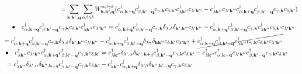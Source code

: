 \documentclass[12pt,english,a4paper]{article}
\newcommand{\dg}{\dagger}
\begin{document}
\begin{appendices}
\begin{align}
	&= \sum_{\textbf{k}, \textbf{k}', \textbf{q}} \sum_{\alpha \beta \gamma \delta} W^{\alpha \beta \gamma \delta}_{\textbf{k},\textbf{k'},\textbf{q}}( c_{\alpha, \textbf{k}+\textbf{q}}^\dg c_{\beta, \textbf{k}' - \textbf{q}}^\dg c_{\gamma, \textbf{k}}c_{\delta, \textbf{k'}}c^\dg_{\lambda \textbf{k}''} c_{\lambda' \textbf{k}''} 
	-  c^\dg_{\lambda \textbf{k}''} c_{\lambda' \textbf{k}''}c_{\alpha, \textbf{k}+\textbf{q}}^\dg c_{\beta, \textbf{k}' - \textbf{q}}^\dg c_{\gamma, \textbf{k}}c_{\delta, \textbf{k'}}) \nonumber \\
\bullet	 \quad c_{\alpha, \textbf{k}+\textbf{q}}^\dg c_{\beta, \textbf{k}' - \textbf{q}}^\dg &c_{\gamma, \textbf{k}}c_{\delta, \textbf{k'}}c^\dg_{\lambda \textbf{k}''} c_{\lambda' \textbf{k}''} = c_{\alpha, \textbf{k}+\textbf{q}}^\dg c_{\beta, \textbf{k}' - \textbf{q}}^\dg c_{\gamma, \textbf{k}}\delta_{\lambda,\delta} \delta_{\textbf{k}',\textbf{k}''} c_{\lambda' \textbf{k}''} - c_{\alpha, \textbf{k}+\textbf{q}}^\dg c_{\beta, \textbf{k}' - \textbf{q}}^\dg c_{\gamma, \textbf{k}} c^\dg_{\lambda \textbf{k}''}c_{\delta, \textbf{k'}} c_{\lambda' \textbf{k}''} \nonumber\\
%
%
= c_{\alpha, \textbf{k}+\textbf{q}}^\dg c_{\beta, \textbf{k}' - \textbf{q}}^\dg c_{\gamma, \textbf{k}}&\delta_{\lambda,\delta} \delta_{\textbf{k}',\textbf{k}''} c_{\lambda' \textbf{k}''} - c_{\alpha, \textbf{k}+\textbf{q}}^\dg c_{\beta, \textbf{k}' - \textbf{q}}^\dg \delta_{\lambda \gamma} \delta_{\textbf{k}\textbf{k}''}c_{\delta, \textbf{k'}} c_{\lambda' \textbf{k}''} 
+ \cancel{c_{\alpha, \textbf{k}+\textbf{q}}^\dg c_{\beta, \textbf{k}' - \textbf{q}}^\dg c^\dg_{\lambda \textbf{k}''}c_{\gamma, \textbf{k}} c_{\delta, \textbf{k'}} c_{\lambda' \textbf{k}''}}\nonumber \\
%
%
\bullet	 \quad c^\dg_{\lambda \textbf{k}''} c_{\lambda' \textbf{k}''} c_{\alpha, \textbf{k}+\textbf{q}}^\dg &c_{\beta, \textbf{k}' - \textbf{q}}^\dg c_{\gamma, \textbf{k}}c_{\delta, \textbf{k'}} = c^\dg_{\lambda \textbf{k}''} \delta_{\lambda',\alpha} \delta_{\textbf{k}'',\textbf{k}+q} c_{\beta, \textbf{k}' - \textbf{q}}^\dg c_{\gamma, \textbf{k}}c_{\delta, \textbf{k'}} - c^\dg_{\lambda \textbf{k}''}  c_{\alpha, \textbf{k}+\textbf{q}}^\dg c_{\lambda' \textbf{k}''} c_{\beta, \textbf{k}' - \textbf{q}}^\dg c_{\gamma, \textbf{k}}c_{\delta, \textbf{k'}} \nonumber\\
= c^\dg_{\lambda \textbf{k}''} \delta_{\lambda',\alpha} \delta_{\textbf{k}'',\textbf{k}+q} &c_{\beta, \textbf{k}' - \textbf{q}}^\dg c_{\gamma, \textbf{k}}c_{\delta, \textbf{k'}} - c^\dg_{\lambda \textbf{k}''}  c_{\alpha, \textbf{k}+\textbf{q}}^\dg \delta_{\lambda'\beta} \delta_{\textbf{k}'',\textbf{k}'-\textbf{q}} c_{\gamma, \textbf{k}}c_{\delta, \textbf{k'}}

\end{align}
\end{appendices}
\end{document}
